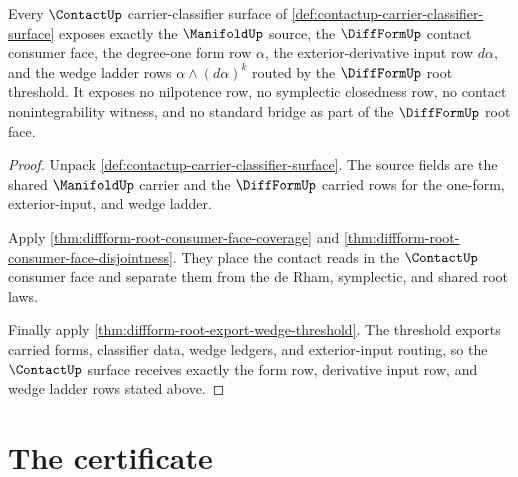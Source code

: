 \begin{theorem}
\label{thm:contactup-form-row-obligation}
Every $\ContactUp$ carrier-classifier surface of \autoref{def:contactup-carrier-classifier-surface} exposes exactly the $\ManifoldUp$ source, the $\DiffFormUp$ contact consumer face, the degree-one form row $\alpha$, the exterior-derivative input row $d\alpha$, and the wedge ladder rows $\alpha\wedge(d\alpha)^k$ routed by the $\DiffFormUp$ root threshold. It exposes no nilpotence row, no symplectic closedness row, no contact nonintegrability witness, and no standard bridge as part of the $\DiffFormUp$ root face.
\end{theorem}
\begin{proof}
Unpack \autoref{def:contactup-carrier-classifier-surface}. The source fields are the shared $\ManifoldUp$ carrier and the $\DiffFormUp$ carried rows for the one-form, exterior-input, and wedge ladder.

Apply \autoref{thm:diffform-root-consumer-face-coverage} and \autoref{thm:diffform-root-consumer-face-disjointness}. They place the contact reads in the $\ContactUp$ consumer face and separate them from the de Rham, symplectic, and shared root laws.

Finally apply \autoref{thm:diffform-root-export-wedge-threshold}. The threshold exports carried forms, classifier data, wedge ledgers, and exterior-input routing, so the $\ContactUp$ surface receives exactly the form row, derivative input row, and wedge ladder rows stated above.
\end{proof}

\section{The certificate}
\label{sec:contact-certificate}

